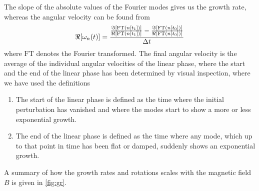 %
The slope of the absolute values of the Fourier modes gives us the growth rate, whereas the angular velocity can be found from
%
\begin{align*}
    \Re[\omega_n(t)] =
    \frac{
        \frac{\Im[\text{FT}(n[t_1])]}{\Re[\text{FT}(n[t_1])]} -
        \frac{\Im[\text{FT}(n[t_0])]}{\Re[\text{FT}(n[t_0])]}
    }{\Delta t}
\end{align*}
%
where $\text{FT}$ denotes the Fourier transformed.
The final angular velocity is the average of the individual angular velocities of the linear phase, where the start and the end of the linear phase has been determined by visual inspection, where we have used the definitions
%
\begin{enumerate}
    \item The start of the linear phase is defined as the time where the initial perturbation has vanished and where the modes start to show a more or less exponential growth.
    \item The end of the linear phase is defined as the time where any mode, which up to that point in time has been flat or damped, suddenly shows an exponential growth.
\end{enumerate}
%
A summary of how the growth rates and rotations scales with the magnetic field $B$ is given in \cref{fig:gr}.
%
